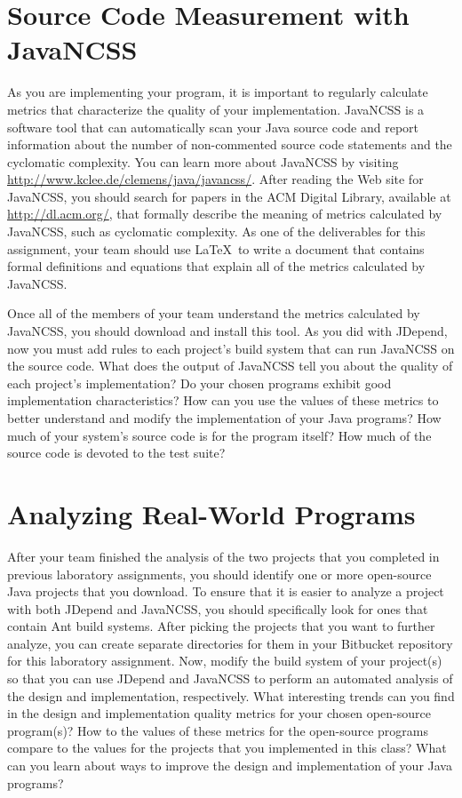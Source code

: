 \section*{Source Code Measurement with JavaNCSS}

As you are implementing your program, it is important to regularly calculate metrics that characterize the quality of
your implementation.  JavaNCSS is a software tool that can automatically scan your Java source code and report
information about the number of non-commented source code statements and the cyclomatic complexity.  You can learn more
about JavaNCSS by visiting \url{http://www.kclee.de/clemens/java/javancss/}. After reading the Web site for JavaNCSS,
you should search for papers in the ACM Digital Library, available at \url{http://dl.acm.org/}, that formally describe
the meaning of metrics calculated by JavaNCSS, such as cyclomatic complexity. As one of the deliverables for this
assignment, your team should use \LaTeX\ to write a document that contains formal definitions and equations that explain
all of the metrics calculated by JavaNCSS.  

Once all of the members of your team understand the metrics calculated by JavaNCSS, you should download and install
this tool.  As you did with JDepend, now you must add rules to each project's build system that can run JavaNCSS on the
source code. What does the output of JavaNCSS tell you about the quality of each project's implementation? Do your
chosen programs exhibit good implementation characteristics? How can you use the values of these metrics to better
understand and modify the implementation of your Java programs? How much of your system's source code is for the
program itself? How much of the source code is devoted to the test suite?

\section*{Analyzing Real-World Programs}

After your team finished the analysis of the two projects that you completed in previous laboratory assignments, you
should identify one or more open-source Java projects that you download.  To ensure that it is easier to analyze a
project with both JDepend and JavaNCSS, you should specifically look for ones that contain Ant build systems. After
picking the projects that you want to further analyze, you can create separate directories for them in your Bitbucket
repository for this laboratory assignment.  Now, modify the build system of your project(s) so that you can use JDepend
and JavaNCSS to perform an automated analysis of the design and implementation, respectively.  What interesting trends
can you find in the design and implementation quality metrics for your chosen open-source program(s)?  How to the values
of these metrics for the open-source programs compare to the values for the projects that you implemented in this class?
What can you learn about ways to improve the design and implementation of your Java programs?

